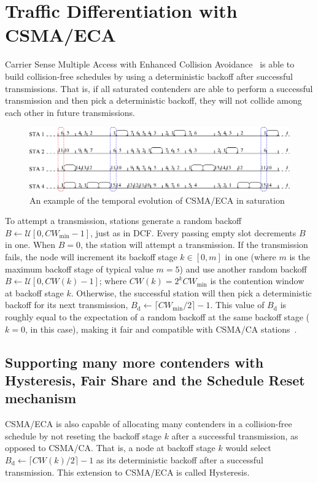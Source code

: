 \section{Traffic Differentiation with CSMA/ECA}\label{section3}
Carrier Sense Multiple Access with Enhanced Collision Avoidance~\cite{sanabria2014high, research2standards} is able to build collision-free schedules by using a deterministic backoff after successful transmissions. That is, if all saturated contenders are able to perform a successful transmission and then pick a deterministic backoff, they will not collide among each other in future transmissions.

	\begin{figure}[tb]
	\centering
		\includegraphics[width=0.8\linewidth]{figures/csma_eca_different_backoff_short.eps}
		\caption{An example of the temporal evolution of CSMA/ECA in saturation}
		\label{fig:ECA}
	\end{figure}
	
To attempt a transmission, stations generate a random backoff $B\leftarrow\mathcal{U}[0,CW_{\min}-1]$, just as in DCF. Every passing empty slot decrements $B$ in one. When $B=0$, the station will attempt a transmission. If the transmission fails, the node will increment its backoff stage $k\in[0,m]$ in one (where $m$ is the maximum backoff stage of typical value $m=5$) and use another random backoff $B\leftarrow\mathcal{U}[0,CW(k)-1]$; where $CW(k)=2^{k}CW_{\min}$ is the contention window at backoff stage $k$. Otherwise, the successful station will then pick a deterministic backoff for its next transmission, $B_{\text{d}}\leftarrow \lceil CW_{\min}/2\rceil-1$. This value of $B_{\text{d}}$ is roughly equal to the expectation of a random backoff at the same backoff stage ($k=0$, in this case), making it fair and compatible with CSMA/CA stations~\cite{research2standards}.

\subsection{Supporting many more contenders with Hysteresis, Fair Share and the Schedule Reset mechanism}\label{scheduleReset}

CSMA/ECA is also capable of allocating many contenders in a collision-free schedule by not reseting the backoff stage $k$ after a successful transmission, as opposed to CSMA/CA. That is, a node at backoff stage $k$ would select $B_{\text{d}}\leftarrow \lceil CW(k)/2\rceil-1$ as its deterministic backoff after a successful transmission. This extension to CSMA/ECA is called Hysteresis. 

